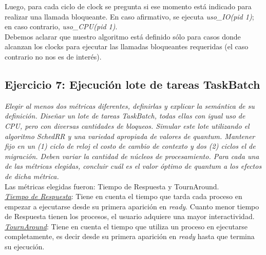 \documentclass[a4paper]{article}
\begin{document}
Luego, para cada ciclo de clock se pregunta si ese momento est\'a indicado para realizar una llamada bloqueante. En caso afirmativo, se ejecuta \textit{uso_IO(pid 1)}; en caso contrario, \textit{uso_CPU(pid 1)}.\\

Debemos aclarar que nuestro algoritmo est\'a definido s\'olo para casos donde alcanzan los clocks para ejecutar las llamadas bloqueantes requeridas (el caso contrario no nos es de inter\'es).

\bigskip 
 \subsection{Ejercicio 7: Ejecuci\'on lote de tareas TaskBatch}
\textit{Elegir al menos dos m\'etricas diferentes, definirlas y explicar la sem\'antica de su definici\'on. Dise\~nar un lote de tareas TaskBatch, todas ellas con igual uso de CPU, pero con diversas cantidades de bloqueos. Simular este lote utilizando el algoritmo SchedRR y una variedad apropiada de valores de quantum. Mantener fijo en un (1) ciclo de reloj el costo de cambio de contexto y dos (2) ciclos el de migraci\'on. Deben variar la cantidad de n\'ucleos de procesamiento. Para cada una de las m\'etricas elegidas, concluir cu\'al es el valor \'optimo de quantum a los efectos de dicha m\'etrica.}\\



Las m\'etricas elegidas fueron: Tiempo de Respuesta y TournAround.\\


\underline{\emph{Tiempo de Respuesta}}: Tiene en cuenta el tiempo que tarda cada proceso en empezar a ejecutarse desde su primera aparici\'on en \textit{ready}. Cuanto menor tiempo de Respuesta tienen los procesos, el usuario adquiere una mayor interactividad.\\

\underline{\emph{TournAround}}: Tiene en cuenta el tiempo que utiliza un proceso en ejecutarse completamente, es decir desde su primera aparici\'on en \textit{ready} hasta que termina su ejecuci\'on.\\

\end{document}
